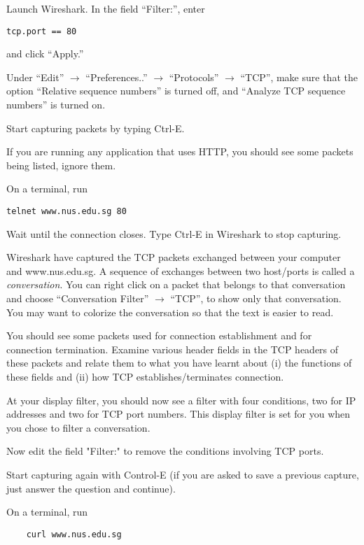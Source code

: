 \documentclass[a4paper,11pt]{exam}
\begin{document}
\begin{questions}

\question Launch Wireshark.  In the field ``Filter:'', enter 
\begin{verbatim}
tcp.port == 80
\end{verbatim}
and click ``Apply.''

Under ``Edit'' $\rightarrow$ ``Preferences..'' $\rightarrow$ ``Protocols'' $\rightarrow$ ``TCP'', make sure that the option ``Relative sequence numbers'' is turned off, and ``Analyze TCP sequence numbers'' is turned on.  

Start capturing packets by typing Ctrl-E.

If you are running any application that uses HTTP, you should see some packets being listed, ignore them.

\question 
On a terminal, run 

\begin{verbatim}
telnet www.nus.edu.sg 80
\end{verbatim}

Wait until the connection closes.  Type Ctrl-E in Wireshark to stop capturing.

Wireshark have captured the TCP packets exchanged between your computer and www.nus.edu.sg.  A sequence of exchanges between two host/ports is called a \textit{conversation}.  You can right click on a packet that belongs to that conversation and choose ``Conversation Filter'' $\rightarrow$  ``TCP'', to show only that conversation.  You may want to colorize the conversation so that the text is easier to read. 

You should see some packets used for connection establishment and for connection termination.  Examine various header fields in the TCP headers of these packets and relate them to what you have learnt about (i) the functions of these fields and (ii) how TCP establishes/terminates connection.

\question 

At your display filter, you should now see a filter with four conditions, two for IP addresses and two for TCP port numbers.  This display filter is set for you when you chose to filter a conversation.

Now edit the field "Filter:" to remove the conditions involving TCP ports.

Start capturing again with Control-E (if you are asked to save a previous capture, just answer the question and continue).

On a terminal, run
\begin{verbatim}
	curl www.nus.edu.sg
\end{verbatim}


\end{questions}
\end{document}
